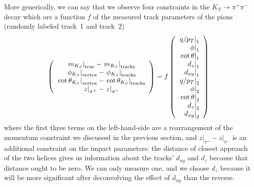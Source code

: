 \documentclass[12pt]{article}
\begin{document}
More generically, we can say that we observe four constraints in the
$K_S\to\pi^+\pi^-$ decay which are a function $f$ of the measured
track parameters of the pions (randomly labeled track~1 and
track~2)
\begin{equation}
\left(\begin{array}{c}
\left.m_{K_S}\right|_{\mbox{\scriptsize true}} - \left.m_{K_S}\right|_{\mbox{\scriptsize tracks}} \\
\left.\phi_{K_S}\right|_{\mbox{\scriptsize vertex}} - \left.\phi_{K_S}\right|_{\mbox{\scriptsize tracks}} \\
\left.\cot\theta_{K_S}\right|_{\mbox{\scriptsize vertex}} - \left.\cot\theta_{K_S}\right|_{\mbox{\scriptsize tracks}} \\
\left.z\right|_{\pi^+} - \left.z\right|_{\pi^-} \\
\end{array}\right) =
f\left(\begin{array}{r}
\left.q/p_T\right|_1 \\
\left.\phi\right|_1 \\
\left.\cot\theta\right|_1 \\
\left.d_z\right|_1 \\
\left.d_{xy}\right|_1 \\
\left.q/p_T\right|_2 \\
\left.\phi\right|_2 \\
\left.\cot\theta\right|_2 \\
\left.d_z\right|_2 \\
\left.d_{xy}\right|_2 \\
\end{array}\right)
\end{equation}
where the first three terms on the left-hand-side are a rearrangement
of the momentum constraint we discussed in the previous section, and
$\left.z\right|_{\pi^+} - \left.z\right|_{\pi^-}$ is an additional
constraint on the impact parameters: the distance of closest approach
of the two helices gives us information about the tracks' $d_{xy}$ and
$d_z$ because that distance ought to be zero.  We can only measure
one, and we choose $d_z$ because it will be more significant after
deconvolving the effect of $d_{xy}$ than the reverse.
\end{document}
